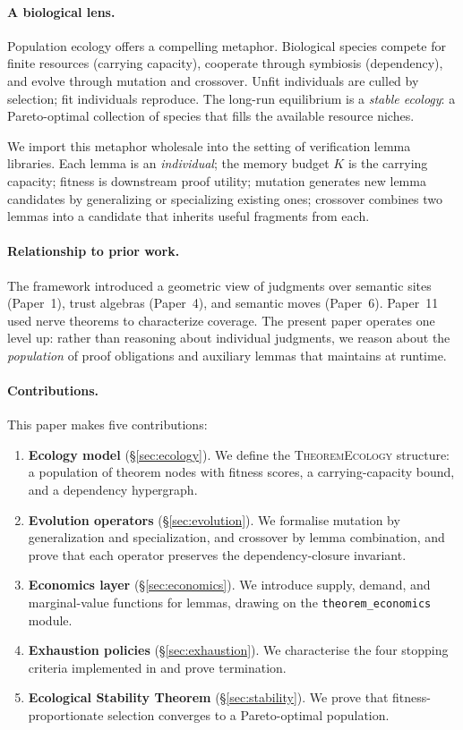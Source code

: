 \documentclass[11pt]{article}
\providecommand{\Cap}{K}                    %
\providecommand{\EcoThm}{\textsc{TheoremEcology}}   %
\begin{document}
\paragraph{A biological lens.}
Population ecology offers a compelling metaphor.  Biological species
compete for finite resources (carrying capacity), cooperate through
symbiosis (dependency), and evolve through mutation and crossover.
Unfit individuals are culled by selection; fit individuals reproduce.
The long-run equilibrium is a \emph{stable ecology}: a Pareto-optimal
collection of species that fills the available resource niches.

We import this metaphor wholesale into the setting of verification
lemma libraries.  Each lemma is an \emph{individual}; the memory
budget $\Cap$ is the carrying capacity; fitness is downstream proof
utility; mutation generates new lemma candidates by generalizing or
specializing existing ones; crossover combines two lemmas into a
candidate that inherits useful fragments from each.

\paragraph{Relationship to prior work.}
The \JuGeo{} framework introduced a geometric view of judgments over
semantic sites (Paper~1), trust algebras (Paper~4), and semantic moves
(Paper~6).  Paper~11 used nerve theorems to characterize coverage.
The present paper operates one level up: rather than reasoning about
individual judgments, we reason about the \emph{population} of proof
obligations and auxiliary lemmas that \JuGeo{} maintains at runtime.

\paragraph{Contributions.}  This paper makes five contributions:

\begin{enumerate}[leftmargin=1.5em]
  \item \textbf{Ecology model} (\S\ref{sec:ecology}).  We define the
    \EcoThm{} structure: a population of theorem nodes with fitness
    scores, a carrying-capacity bound, and a dependency hypergraph.
  \item \textbf{Evolution operators} (\S\ref{sec:evolution}).  We
    formalise mutation by generalization and specialization, and
    crossover by lemma combination, and prove that each operator
    preserves the dependency-closure invariant.
  \item \textbf{Economics layer} (\S\ref{sec:economics}).  We
    introduce supply, demand, and marginal-value functions for lemmas,
    drawing on the \texttt{theorem\_economics} module.
  \item \textbf{Exhaustion policies} (\S\ref{sec:exhaustion}).  We
    characterise the four stopping criteria implemented in \JuGeo{}
    and prove termination.
  \item \textbf{Ecological Stability Theorem}
    (\S\ref{sec:stability}).  We prove that fitness-proportionate
    selection converges to a Pareto-optimal population.
\end{enumerate}
\end{document}
